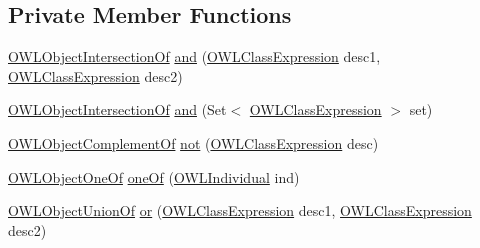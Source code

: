 \subsection*{Private Member Functions}
\begin{DoxyCompactItemize}
\item 
\hyperlink{interfaceorg_1_1semanticweb_1_1owlapi_1_1model_1_1_o_w_l_object_intersection_of}{O\-W\-L\-Object\-Intersection\-Of} \hyperlink{classcom_1_1clarkparsia_1_1owlapi_1_1explanation_1_1_satisfiability_converter_1_1_axiom_converter_a477217051b33fe6dd6a283bb2eb59741}{and} (\hyperlink{interfaceorg_1_1semanticweb_1_1owlapi_1_1model_1_1_o_w_l_class_expression}{O\-W\-L\-Class\-Expression} desc1, \hyperlink{interfaceorg_1_1semanticweb_1_1owlapi_1_1model_1_1_o_w_l_class_expression}{O\-W\-L\-Class\-Expression} desc2)
\item 
\hyperlink{interfaceorg_1_1semanticweb_1_1owlapi_1_1model_1_1_o_w_l_object_intersection_of}{O\-W\-L\-Object\-Intersection\-Of} \hyperlink{classcom_1_1clarkparsia_1_1owlapi_1_1explanation_1_1_satisfiability_converter_1_1_axiom_converter_a04833c94e09c421def76190d43775b54}{and} (Set$<$ \hyperlink{interfaceorg_1_1semanticweb_1_1owlapi_1_1model_1_1_o_w_l_class_expression}{O\-W\-L\-Class\-Expression} $>$ set)
\item 
\hyperlink{interfaceorg_1_1semanticweb_1_1owlapi_1_1model_1_1_o_w_l_object_complement_of}{O\-W\-L\-Object\-Complement\-Of} \hyperlink{classcom_1_1clarkparsia_1_1owlapi_1_1explanation_1_1_satisfiability_converter_1_1_axiom_converter_a12a2b015499d2f6003f77641c81deff5}{not} (\hyperlink{interfaceorg_1_1semanticweb_1_1owlapi_1_1model_1_1_o_w_l_class_expression}{O\-W\-L\-Class\-Expression} desc)
\item 
\hyperlink{interfaceorg_1_1semanticweb_1_1owlapi_1_1model_1_1_o_w_l_object_one_of}{O\-W\-L\-Object\-One\-Of} \hyperlink{classcom_1_1clarkparsia_1_1owlapi_1_1explanation_1_1_satisfiability_converter_1_1_axiom_converter_af1dfd55da87f8ebab8e95a16374d99ab}{one\-Of} (\hyperlink{interfaceorg_1_1semanticweb_1_1owlapi_1_1model_1_1_o_w_l_individual}{O\-W\-L\-Individual} ind)
\item 
\hyperlink{interfaceorg_1_1semanticweb_1_1owlapi_1_1model_1_1_o_w_l_object_union_of}{O\-W\-L\-Object\-Union\-Of} \hyperlink{classcom_1_1clarkparsia_1_1owlapi_1_1explanation_1_1_satisfiability_converter_1_1_axiom_converter_a3d7569699184a73c3bde7910fbbe3c81}{or} (\hyperlink{interfaceorg_1_1semanticweb_1_1owlapi_1_1model_1_1_o_w_l_class_expression}{O\-W\-L\-Class\-Expression} desc1, \hyperlink{interfaceorg_1_1semanticweb_1_1owlapi_1_1model_1_1_o_w_l_class_expression}{O\-W\-L\-Class\-Expression} desc2)
\end{DoxyCompactItemize}
